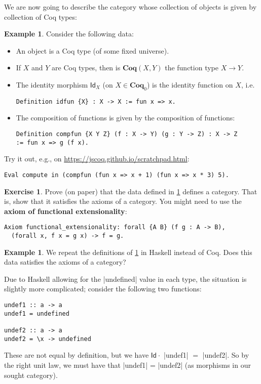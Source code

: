 \documentclass[a4paper,11pt, oneside,titlepage=false]{scrbook}
\theoremstyle{plain}
\theoremstyle{definition}
\newtheorem{exa}[thm]{Example}
\newtheorem{exer}[thm]{Exercise}
\newcommand{\cfont}[1]{\ensuremath{\mathsf{#1}}}
\newcommand{\Catb}[1]{\mathbf{#1}}
\newcommand{\COQ}{\Catb{Coq}}
\newcommand{\Ob}[1]{{#1}_0}
\newcommand{\CHom}[3]{{#1}(#2,#3)}
\newcommand{\Id}[1][]{\cfont{Id}_{#1}}
\newcommand{\Comp}{\cdot}
\begin{document}
We are now going to describe the category whose collection of objects is given by collection of Coq types:
\begin{exa}\label{exa:coq-cat}
  Consider the following data: 
\begin{itemize}
\item An object is a Coq type (of some fixed universe).
\item If $X$ and $Y$ are Coq types, then is $\CHom \COQ X Y$ the function type $X\to Y$.
\item The identity morphism $\Id[X]$ (on $X\in \Ob{\COQ}$) is the identity function on $X$, i.e.
\begin{lstlisting}
Definition idfun {X} : X -> X := fun x => x.
\end{lstlisting}
\item The composition of functions is given by the composition of functions:
\begin{lstlisting}
Definition compfun {X Y Z} (f : X -> Y) (g : Y -> Z) : X -> Z
:= fun x => g (f x).
\end{lstlisting}
\end{itemize}
  Try it out, e.g., on \url{https://jscoq.github.io/scratchpad.html}:
\begin{lstlisting}
Eval compute in (compfun (fun x => x + 1) (fun x => x * 3) 5).
\end{lstlisting}  
\end{exa}

\begin{exer}
  Prove (on paper) that the data defined in \cref{exa:coq-cat} defines a category.
  That is, show that it satisfies the axioms of a category.
  You might need to use the \textbf{axiom of functional extensionality}:
\begin{lstlisting}
Axiom functional_extensionality: forall {A B} (f g : A -> B),
  (forall x, f x = g x) -> f = g.
\end{lstlisting}
\end{exer}

\begin{exa}
  We repeat the definitions of \cref{exa:coq-cat} in Haskell instead of Coq.
  Does this data satisfies the axioms of a category?

  Due to Haskell allowing for the |undefined| value in each type, the situation is slightly more complicated; consider the following two functions:
\begin{lstlisting}
undef1 :: a -> a
undef1 = undefined

undef2 :: a -> a
undef2 = \x -> undefined
\end{lstlisting}
These are not equal by definition, but we have $\Id \Comp$ |undef1| $=$ |undef2|.
So by the right unit law, we must have that |undef1| = |undef2| (as morphisms in our sought category).
\end{exa}
\end{document}
